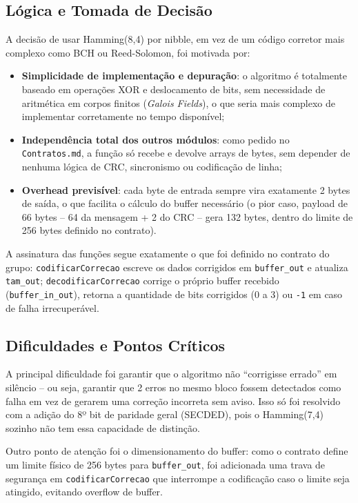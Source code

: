 \subsection{Lógica e Tomada de Decisão}

A decisão de usar Hamming(8,4) por nibble, em vez de um código corretor mais complexo
como BCH ou Reed-Solomon, foi motivada por:

\begin{itemize}
  \item \textbf{Simplicidade de implementação e depuração}: o algoritmo é totalmente
        baseado em operações XOR e deslocamento de bits, sem necessidade de aritmética
        em corpos finitos (\emph{Galois Fields}), o que seria mais complexo de implementar
        corretamente no tempo disponível;
  \item \textbf{Independência total dos outros módulos}: como pedido no
        \texttt{Contratos.md}, a função só recebe e devolve arrays de bytes, sem
        depender de nenhuma lógica de CRC, sincronismo ou codificação de linha;
  \item \textbf{Overhead previsível}: cada byte de entrada sempre vira exatamente 2 bytes
        de saída, o que facilita o cálculo do buffer necessário (o pior caso,
        payload de 66 bytes -- 64 da mensagem + 2 do CRC -- gera 132 bytes, dentro do
        limite de 256 bytes definido no contrato).
\end{itemize}

A assinatura das funções segue exatamente o que foi definido no contrato do grupo:
\texttt{codificarCorrecao} escreve os dados corrigidos em \texttt{buffer\_out} e atualiza
\texttt{tam\_out}; \texttt{decodificarCorrecao} corrige o próprio buffer recebido
(\texttt{buffer\_in\_out}), retorna a quantidade de bits corrigidos (0 a 3) ou \texttt{-1}
em caso de falha irrecuperável.

\subsection{Dificuldades e Pontos Críticos}

A principal dificuldade foi garantir que o algoritmo não ``corrigisse errado'' em
silêncio -- ou seja, garantir que 2 erros no mesmo bloco fossem detectados como falha
em vez de gerarem uma correção incorreta sem aviso. Isso só foi resolvido com a adição
do 8º bit de paridade geral (SECDED), pois o Hamming(7,4) sozinho não tem essa
capacidade de distinção.

Outro ponto de atenção foi o dimensionamento do buffer: como o contrato define um limite
físico de 256 bytes para \texttt{buffer\_out}, foi adicionada uma trava de segurança em
\texttt{codificarCorrecao} que interrompe a codificação caso o limite seja atingido,
evitando overflow de buffer.


